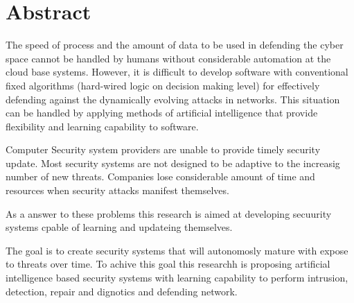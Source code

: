 \chapter*{Abstract} 

The speed of process and the amount of data to be used in defending the cyber space cannot be handled by humans without considerable automation at the cloud base systems.
However, it is difficult to develop software with conventional fixed algorithms (hard-wired logic on decision making level)
for effectively defending against the dynamically evolving attacks in networks. This situation can be handled by applying methods of artificial intelligence that provide flexibility
and learning capability to software.

Computer Security system providers are unable to provide timely security update. Most security systems are not designed to be adaptive to 
the increasig number of new threats. Companies lose considerable amount of time and resources when security attacks manifest themselves. 

As a answer to these problems this research is aimed at developing secuurity systems cpable of learning and updateing themselves.

The goal is to create security systems that will autonomosly mature with expose to threats over time.
To achive this goal this researchh is proposing artificial intelligence based security systems with learning capability 
to perform intrusion, detection, repair and dignotics and defending network.

